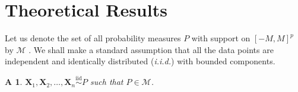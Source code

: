 \documentclass[12pt]{article}
\newcommand{\bX}{\boldsymbol{X}}
\newcommand{\bTheta}{\boldsymbol{\Theta}}
\newtheorem{assumption}{A\hspace{-2pt}}
\begin{document}
\section{Theoretical Results}
\label{sec:theory}









Let us denote the set of all probability measures $P$ with support on $[-M,M]^p$ by $\mathcal{M}$%
. We shall make a standard assumption that all the data points are independent and identically distributed (\textit{i.i.d.}) with bounded components.

\begin{assumption}\label{ass-1-iid}
    $\bm{X}_1,\bm{X}_2,\ldots,\bm{X}_n \overset{\text{iid}}{\sim}P$ such that $P\in \mathcal{M}$.
\end{assumption}
\end{document}
